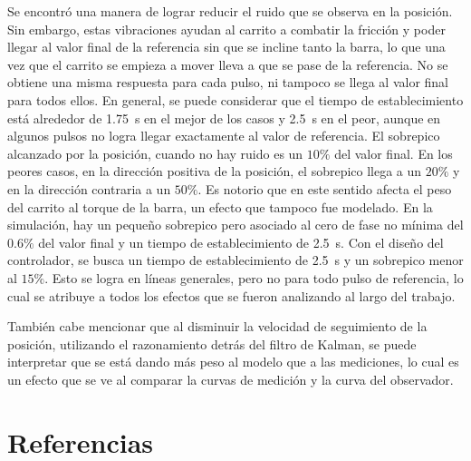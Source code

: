 \documentclass[a4paper,10pt]{article}
\begin{document}
Se encontró una manera de lograr reducir el ruido que se observa en la posición. Sin embargo, estas vibraciones ayudan al carrito a combatir la fricción y poder llegar al valor final de la referencia sin que se incline tanto la barra, lo que una vez que el carrito se empieza a mover lleva a que se pase de la referencia. No se obtiene una misma respuesta para cada pulso, ni tampoco se llega al valor final para todos ellos. En general, se puede considerar que el tiempo de establecimiento está alrededor de
\SI{1.75}{\second} en el mejor de los casos y \SI{2.5}{\second} en el peor, aunque en algunos pulsos no logra llegar exactamente al valor de referencia. 
El sobrepico alcanzado por la posición, cuando no hay ruido es un $10\%$ del valor final. En los peores casos, en la dirección positiva de la posición, el sobrepico llega a un $20\%$ y en la dirección contraria a un $50\%$. Es notorio que en este sentido afecta el peso del carrito al torque de la barra, un efecto que tampoco fue modelado. En la simulación, hay un pequeño sobrepico pero asociado al cero de fase no mínima del $0.6\%$ del valor final y un tiempo de establecimiento de \SI{2.5}{\second}.
Con el diseño del controlador, se busca un tiempo de establecimiento de \SI{2.5}{\second} y un sobrepico menor al $15\%$. Esto se logra en líneas generales, pero no para todo pulso de referencia, lo cual se atribuye a todos los efectos que se fueron analizando al largo del trabajo. 

También cabe mencionar que al disminuir la velocidad de seguimiento de la posición, utilizando el razonamiento detrás del filtro de Kalman, se puede interpretar que se está dando más peso al modelo que a las mediciones, lo cual es un efecto que se ve al comparar la curvas de medición y la curva del observador.

\section{Referencias}
\renewcommand{\section}[2]{}


\end{document}
